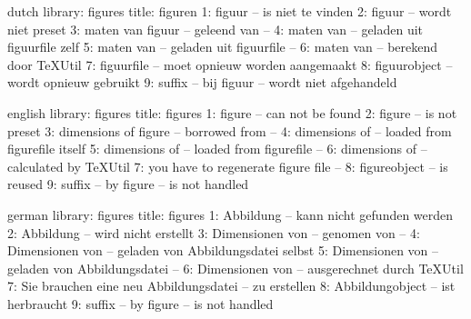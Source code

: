 


\unprotect


\startmessages  dutch  library: figures
   title: figuren
       1: figuur -- is niet te vinden
       2: figuur -- wordt niet preset
       3: maten van figuur -- geleend van --
       4: maten van -- geladen uit figuurfile zelf
       5: maten van -- geladen uit figuurfile --
       6: maten van -- berekend door TeXUtil
       7: figuurfile -- moet opnieuw worden aangemaakt
       8: figuurobject -- wordt opnieuw gebruikt
       9: suffix -- bij figuur -- wordt niet afgehandeld
\stopmessages

\startmessages  english  library: figures
   title: figures
       1: figure -- can not be found
       2: figure -- is not preset
       3: dimensions of figure -- borrowed from --
       4: dimensions of -- loaded from figurefile itself
       5: dimensions of -- loaded from figurefile --
       6: dimensions of -- calculated by TeXUtil
       7: you have to regenerate figure file --
       8: figureobject -- is reused
       9: suffix -- by figure -- is not handled
\stopmessages


\startmessages  german  library: figures
   title: figures
       1: Abbildung -- kann nicht gefunden werden
       2: Abbildung -- wird nicht erstellt
       3: Dimensionen von -- genomen von --
       4: Dimensionen von -- geladen von Abbildungsdatei selbst
       5: Dimensionen von -- geladen von Abbildungsdatei --
       6: Dimensionen von -- ausgerechnet durch TeXUtil
       7: Sie brauchen eine neu Abbildungsdatei -- zu erstellen
       8: Abbildungobject -- ist herbraucht
       9: suffix -- by figure -- is not handled
\stopmessages

